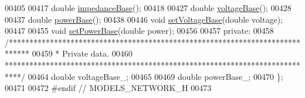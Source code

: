 \begin{DoxyCode}
00405 
00417   \textcolor{keywordtype}{double} \hyperlink{group___models_gae6794c93d37df113778c37c2c702f6d9}{impedanceBase}();
00418 
00427   \textcolor{keywordtype}{double} \hyperlink{group___models_ga88cd2506aaf0b19513e41f00608093e0}{voltageBase}();
00428 
00437   \textcolor{keywordtype}{double} \hyperlink{group___models_ga6fdbd7d04d12a3f1215c92e2e20eabdb}{powerBase}();
00438 
00446   \textcolor{keywordtype}{void} \hyperlink{group___models_gac2787bb9c323716baa2e6fba06136f2b}{setVoltageBase}(\textcolor{keywordtype}{double} voltage);
00447 
00455   \textcolor{keywordtype}{void} \hyperlink{group___models_ga3ba9ef05ea0c5037a415cfab25d03a0d}{setPowerBase}(\textcolor{keywordtype}{double} power);
00456 
00457 \textcolor{keyword}{private}:
00458   \textcolor{comment}{/*****************************************************************************}
00459 \textcolor{comment}{   * Private data.}
00460 \textcolor{comment}{   ****************************************************************************/}
00464   \textcolor{keywordtype}{double} voltageBase\_;
00465 
00469   \textcolor{keywordtype}{double} powerBase\_;
00470 \};
00471 
00472 \textcolor{preprocessor}{#endif  // MODELS\_NETWORK\_H}
00473 
\end{DoxyCode}
